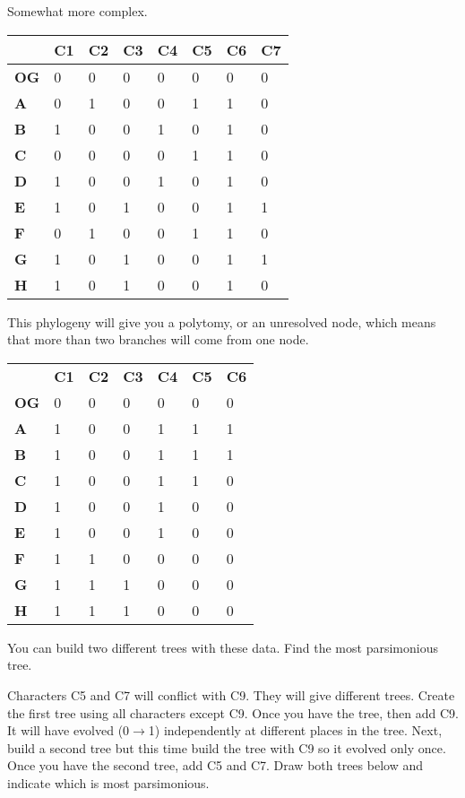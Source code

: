 \documentclass[11pt, addpoints, hidelinks]{exam}
\newcommand*\AnswerBox[2]{%
	\parbox[t][#1]{0.92\textwidth}{%
		\begin{solution}#2\end{solution}}
	\vspace{\stretch{1}}
}
\begin{document}
\begin{questions}
\newpage

\question[3]
Somewhat more complex.

\begin{longtable}[l]{@{}llllllll@{}}
\toprule
& \textbf{C1} & \textbf{C2} & \textbf{C3} & \textbf{C4} & \textbf{C5} &
\textbf{C6} & \textbf{C7}\tabularnewline
\midrule
\endhead
\textbf{OG} & 0 & 0 & 0 & 0 & 0 & 0 & 0\tabularnewline
\textbf{A} & 0 & 1 & 0 & 0 & 1 & 1 & 0\tabularnewline
\textbf{B} & 1 & 0 & 0 & 1 & 0 & 1 & 0\tabularnewline
\textbf{C} & 0 & 0 & 0 & 0 & 1 & 1 & 0\tabularnewline
\textbf{D} & 1 & 0 & 0 & 1 & 0 & 1 & 0\tabularnewline
\textbf{E} & 1 & 0 & 1 & 0 & 0 & 1 & 1\tabularnewline
\textbf{F} & 0 & 1 & 0 & 0 & 1 & 1 & 0\tabularnewline
\textbf{G} & 1 & 0 & 1 & 0 & 0 & 1 & 1\tabularnewline
\textbf{H} & 1 & 0 & 1 & 0 & 0 & 1 & 0\tabularnewline
\bottomrule
\end{longtable}

\AnswerBox{0.2\textheight}{}

\question[3]
This phylogeny will give you a polytomy, or an unresolved
node, which means that more than two branches will come from one node.

\begin{longtable}[l]{@{}lllllll@{}}
\toprule
\endhead
& \textbf{C1} & \textbf{C2} & \textbf{C3} & \textbf{C4} & \textbf{C5} &
\textbf{C6}\tabularnewline
\textbf{OG} & 0 & 0 & 0 & 0 & 0 & 0\tabularnewline
\textbf{A} & 1 & 0 & 0 & 1 & 1 & 1\tabularnewline
\textbf{B} & 1 & 0 & 0 & 1 & 1 & 1\tabularnewline
\textbf{C} & 1 & 0 & 0 & 1 & 1 & 0\tabularnewline
\textbf{D} & 1 & 0 & 0 & 1 & 0 & 0\tabularnewline
\textbf{E} & 1 & 0 & 0 & 1 & 0 & 0\tabularnewline
\textbf{F} & 1 & 1 & 0 & 0 & 0 & 0\tabularnewline
\textbf{G} & 1 & 1 & 1 & 0 & 0 & 0\tabularnewline
\textbf{H} & 1 & 1 & 1 & 0 & 0 & 0\tabularnewline
\bottomrule
\end{longtable}

\AnswerBox{0.1\textheight}{}

\newpage

\question[3]
You can build two different trees with these data. Find the most parsimonious tree.

Characters C5 and C7 will conflict with C9. They will give different
trees. Create the first tree using all characters except C9. Once
you have the tree, then add C9. It will have evolved (0$\rightarrow$1) 
independently at different places in the tree. Next, build a 
second tree but this time build the tree with C9 so it evolved only once.
Once you have the second tree, add C5 and C7. Draw both trees below and indicate which 
is most parsimonious.


\end{questions}
\end{document}

